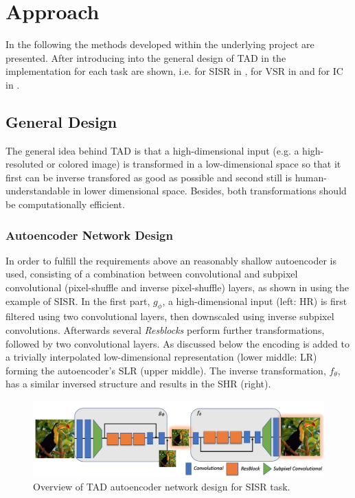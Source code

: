 \newpage
\section{Approach}
\label{sec:Approach}
In the following the methods developed within the underlying project are
presented. After introducing into the general design of \ac{TAD} in
 the implementation for each task are shown, i.e. for
\ac{SISR} in , for \ac{VSR} in
 and for \ac{IC} in .

\subsection{General Design}
\label{sec:Approach_GD}
The general idea behind \ac{TAD} is that a high-dimensional input (e.g. a
high-resoluted or colored image) is transformed in a low-dimensional space so
that it first can be inverse transfored as good as possible and second still is
human-understandable in lower dimensional space. Besides, both transformations
should be computationally efficient.

\subsubsection*{Autoencoder Network Design}
In order to fulfill the requirements above an reasonably shallow autoencoder is
used, consisting of a combination between convolutional and subpixel convolutional
(pixel-shuffle and inverse pixel-shuffle) layers, as shown in
 using the example of \ac{SISR}.
\newline
In the first part, $g_\phi$, a high-dimensional input (left: \ac{HR}) is first
filtered using two convolutional layers, then downscaled using inverse subpixel
convolutions. Afterwards several \textit{Resblocks} perform further
transformations, followed by two convolutional layers. As discussed below the
encoding is added to a trivially interpolated low-dimensional representation
(lower middle: \ac{LR}) forming the autoencoder's \ac{SLR} (upper middle).
The inverse transformation, $f_\theta$, has a similar inversed structure and
results in the \ac{SHR} (right).

\begin{figure}[!htbp]
	\centering
	\includegraphics[width=12cm]{figures/architecture}
	\caption{Overview of \ac{TAD} autoencoder network design for \ac{SISR} task.}
  \label{fig:architecture}
\end{figure}

